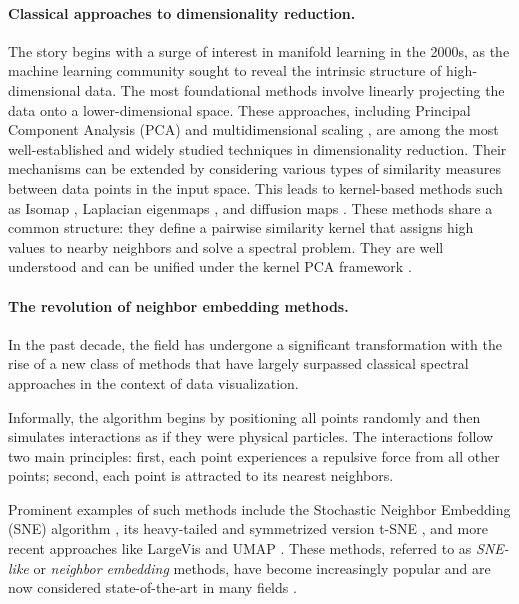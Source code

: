 \paragraph{Classical approaches to dimensionality reduction.}
The story begins with a surge of interest in manifold learning in the 2000s, as the machine learning community sought to reveal the intrinsic structure of high-dimensional data.
The most foundational methods involve linearly projecting the data onto a lower-dimensional space. These approaches, including Principal Component Analysis (PCA) \citep{pearson1901liii} and multidimensional scaling \citep{kruskal1978multidimensional}, are among the most well-established and widely studied techniques in dimensionality reduction. Their mechanisms can be extended by considering various types of similarity measures between data points in the input space. This leads to kernel-based methods such as Isomap \citep{balasubramanian2002isomap}, Laplacian eigenmaps \citep{belkin2003laplacian}, and diffusion maps \citep{coifman2006diffusion}. These methods share a common structure: they define a pairwise similarity kernel that assigns high values to nearby neighbors and solve a spectral problem. They are well understood and can be unified under the kernel PCA framework \citep{ham2004kernel}.

\paragraph{The revolution of neighbor embedding methods.}
In the past decade, the field has undergone a significant transformation with the rise of a new class of methods that have largely surpassed classical spectral approaches in the context of data visualization. 

Informally, the algorithm begins by positioning all points randomly and then simulates interactions as if they were physical particles. The interactions follow two main principles: first, each point experiences a repulsive force from all other points; second, each point is attracted to its nearest neighbors.

Prominent examples of such methods include the Stochastic Neighbor Embedding (SNE) algorithm \citep{NIPS2002SNE}, its heavy-tailed and symmetrized version t-SNE \citep{maaten2008tSNE}, and more recent approaches like LargeVis \citep{tang2016visualizing} and UMAP \citep{mcinnes2018umap}. These methods, referred to as \textit{SNE-like} or \textit{neighbor embedding} methods, have become increasingly popular and are now considered state-of-the-art in many fields \citep{li2017application,kobak2019art,anders2018dissecting}.
 
